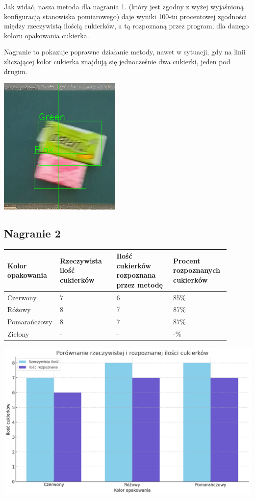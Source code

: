 \documentclass{article}
\begin{document}
Jak widać, nasza metoda dla nagrania 1. (który jest zgodny z wyżej wyjaśnioną konfiguracją stanowiska pomiarowego) daje wyniki 100-tu procentowej zgodności między rzeczywistą ilością cukierków, a tą rozpoznaną przez program, dla danego koloru opakowania cukierka.

Nagranie to pokazuje poprawne działanie metody, nawet w sytuacji, gdy na linii zliczającej kolor cukierka znajdują się jednocześnie dwa cukierki, jeden pod drugim.

\begin{center}
\includegraphics[width=6cm]{badanie.png}
\end{center}

\subsection{Nagranie 2}


\begin{center}
\begin{tabular}{|p{0.15\linewidth}|p{0.25\linewidth}|p{0.25\linewidth}|p{0.25\linewidth}|}
 \hline
 Kolor opakowania & Rzeczywista ilość cukierków & Ilość cukierków rozpoznana przez metodę & Procent rozpoznanych cukierków \\
 \hline
 Czerwony & 7 & 6 & 85\% \\
 \hline
 Różowy & 8 & 7 & 87\% \\
 \hline
 Pomarańczowy & 8 & 7 & 87\% \\
 \hline
 Zielony & - & - & -\% \\
 \hline
\end{tabular}
\end{center}

\begin{center}
\includegraphics[width=\linewidth]{wykres2.png}
\end{center}
\end{document}
